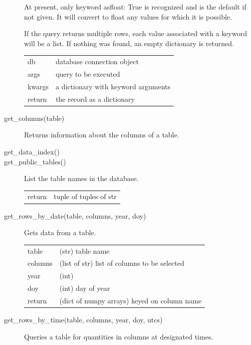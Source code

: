 \documentclass[letterpaper,11pt]{report}
\begin{document}
\begin{description}
    At present, only keyword {\ttfamily asfloat: True} is recognized and 
    is the default if not given.  It will convert to float any values for 
    which it is possible.
    
    If the query returns multiple rows, each value associated with a keyword 
    will be a list. If nothing was found, an empty dictionary is returned.\\
    \begin{tabular}{ll}
        db & database connection object \\
        args & query to be executed \\
        kwargs & a dictionary with keyword arguments \\
        return & the record as a dictionary \\
    \end{tabular}
    \item[get\_columns(table)] Returns information about the columns of a table.
    \item[get\_data\_index()]
    \item[get\_public\_tables()] List the table names in the database.\\
    \begin{tabular}{ll}
        return &  tuple of tuples of str \\
    \end{tabular}
    \item[get\_rows\_by\_date(table, columns, year, doy)] Gets data from a table.\\
    \begin{tabular}{ll}
        table & (str) table name \\
        columns & (list of str) list of columns to be selected \\
        year & (int) \\
        doy &(int) day of year \\
        return & (dict of numpy arrays) keyed on column name \\
    \end{tabular}
    \item[get\_rows\_by\_time(table, columns, year, doy, utcs)] Queries a table 
    for quantities in columns at designated times.
    

\end{description}
\end{document}
